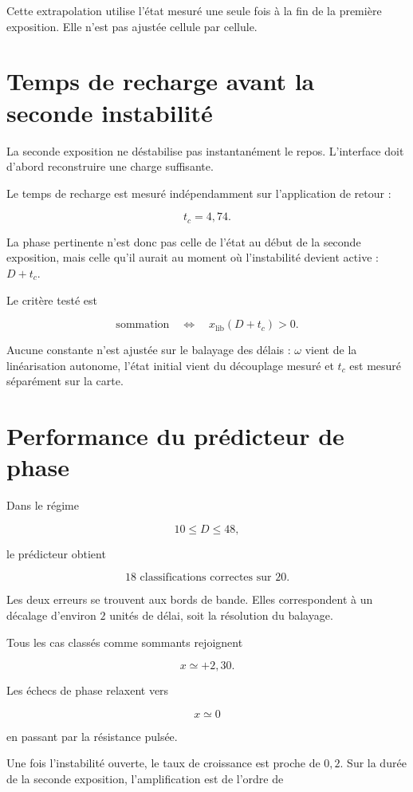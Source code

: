 Cette extrapolation utilise l'état mesuré une seule fois à la fin de
la première exposition. Elle n'est pas ajustée cellule par cellule.

\section{Temps de recharge avant la seconde instabilité}
\label{annexe-num-temps-charge}

La seconde exposition ne déstabilise pas instantanément le repos.
L'interface doit d'abord reconstruire une charge suffisante.

Le temps de recharge est mesuré indépendamment sur l'application de
retour :

\[
\boxed{t_c=4{,}74.}
\]

La phase pertinente n'est donc pas celle de l'état au début de la
seconde exposition, mais celle qu'il aurait au moment où l'instabilité
devient active : \(D+t_c\).

Le critère testé est

\[
\boxed{
\text{sommation}
\quad\Longleftrightarrow\quad
x_{\mathrm{lib}}(D+t_c)>0.
}
\]

Aucune constante n'est ajustée sur le balayage des délais : \(\omega\)
vient de la linéarisation autonome, l'état initial vient du découplage
mesuré et \(t_c\) est mesuré séparément sur la carte.

\section{Performance du prédicteur de phase}
\label{annexe-num-performance-phase}

Dans le régime

\[
10\leq D\leq48,
\]

le prédicteur obtient

\[
\boxed{18\text{ classifications correctes sur }20.}
\]

Les deux erreurs se trouvent aux bords de bande. Elles correspondent à
un décalage d'environ \(2\) unités de délai, soit la résolution du
balayage.

Tous les cas classés comme sommants rejoignent

\[
x\simeq+2{,}30.
\]

Les échecs de phase relaxent vers

\[
x\simeq0
\]

en passant par la résistance pulsée.

Une fois l'instabilité ouverte, le taux de croissance est proche de
\(0{,}2\). Sur la durée de la seconde exposition, l'amplification est
de l'ordre de


